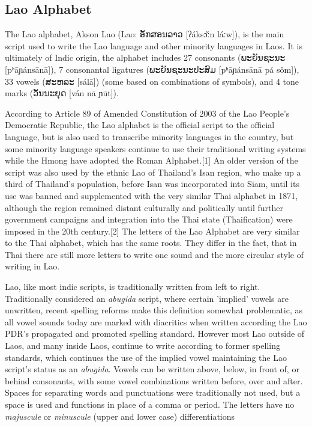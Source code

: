 \subsection{Lao Alphabet}

\newfontfamily{}

\def\laotext#1{{\lao#1}}

The Lao alphabet, Akson Lao (Lao: \laotext{ອັກສອນລາວ} [ʔáksɔ̌ːn láːw]), is the main script used to write the Lao language and other minority languages in Laos. It is ultimately of Indic origin, the alphabet includes 27 consonants (\laotext{ພະຍັນຊະນະ} [pʰāɲánsānā]), 7 consonantal ligatures (\laotext{ພະຍັນຊະນະປະສົມ} [pʰāɲánsānā pá sǒm]), 33 vowels (\laotext{ສະຫລະ} [sálā]) (some based on combinations of symbols), and 4 tone marks (\laotext{ວັນນະຍຸດ} [ván nā ɲūt]). 



According to Article 89 of Amended Constitution of 2003 of the Lao People's Democratic Republic, the Lao alphabet is the official script to the official language, but is also used to transcribe minority languages in the country, but some minority language speakers continue to use their traditional writing systems while the Hmong have adopted the Roman Alphabet.[1] An older version of the script was also used by the ethnic Lao of Thailand's Isan region, who make up a third of Thailand's population, before Isan was incorporated into Siam, until its use was banned and supplemented with the very similar Thai alphabet in 1871, although the region remained distant culturally and politically until further government campaigns and integration into the Thai state (Thaification) were imposed in the 20th century.[2] The letters of the Lao Alphabet are very similar to the Thai alphabet, which has the same roots. They differ in the fact, that in Thai there are still more letters to write one sound and the more circular style of writing in Lao.

Lao, like most indic scripts, is traditionally written from left to right. Traditionally considered an \emph{abugida} script, where certain 'implied' vowels are unwritten, recent spelling reforms make this definition somewhat problematic, as all vowel sounds today are marked with diacritics when written according the Lao PDR's propagated and promoted spelling standard. However most Lao outside of Laos, and many inside Laos, continue to write according to former spelling standards, which continues the use of the implied vowel maintaining the Lao script's status as an \emph{abugida}. Vowels can be written above, below, in front of, or behind consonants, with some vowel combinations written before, over and after. Spaces for separating words and punctuations were traditionally not used, but a space is used and functions in place of a comma or period. The letters have no \emph{majuscule} or \emph{minuscule} (upper and lower case) differentiations

